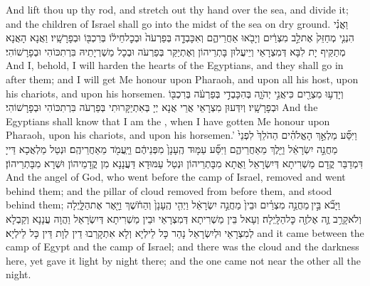 {And lift thou up thy rod, and stretch out thy hand over the sea, and divide it; and the children of Israel shall go into the midst of the sea on dry ground.}{}
{וַאֲנִ֗י הִנְנִ֤י מְחַזֵּק֙ אֶת\maqqaf לֵ֣ב מִצְרַ֔יִם וְיָבֹ֖אוּ אַחֲרֵיהֶ֑ם וְאִכָּבְדָ֤ה בְּפַרְעֹה֙ וּבְכׇל\maqqaf חֵיל֔וֹ בְּרִכְבּ֖וֹ וּבְפָרָשָֽׁיו׃}
{וַאֲנָא הָאֲנָא מְתַקֵּיף יָת לִבָּא דְּמִצְרָאֵי וְיֵיעֲלוּן בָּתְרֵיהוֹן וְאֶתְיַקַּר בְּפַרְעֹה וּבְכָל מַשְׁרְיָתֵיהּ בִּרְתִכּוֹהִי וּבְפָרָשׁוֹהִי׃}
{And I, behold, I will harden the hearts of the Egyptians, and they shall go in after them; and I will get Me honour upon Pharaoh, and upon all his host, upon his chariots, and upon his horsemen.}{}
{וְיָדְע֥וּ מִצְרַ֖יִם כִּי\maqqaf אֲנִ֣י יְהֹוָ֑ה בְּהִכָּבְדִ֣י בְּפַרְעֹ֔ה בְּרִכְבּ֖וֹ וּבְפָרָשָֽׁיו׃}
{וְיִדְּעוּן מִצְרָאֵי אֲרֵי אֲנָא יְיָ בְּאִתְיַקָּרוּתִי בְּפַרְעֹה בִּרְתִכּוֹהִי וּבְפָרָשׁוֹהִי׃}
{And the Egyptians shall know that I am the \lord, when I have gotten Me honour upon Pharaoh, upon his chariots, and upon his horsemen.’}{}
{וַיִּסַּ֞ע מַלְאַ֣ךְ הָאֱלֹהִ֗ים הַהֹלֵךְ֙ לִפְנֵי֙ מַחֲנֵ֣ה יִשְׂרָאֵ֔ל וַיֵּ֖לֶךְ מֵאַחֲרֵיהֶ֑ם וַיִּסַּ֞ע עַמּ֤וּד הֶֽעָנָן֙ מִפְּנֵיהֶ֔ם וַיַּֽעֲמֹ֖ד מֵאַחֲרֵיהֶֽם׃}
{וּנְטַל מַלְאֲכָא דַּייָ דִּמְדַבַּר קֳדָם מַשְׁרִיתָא דְּיִשְׂרָאֵל וַאֲתָא מִבָּתְרֵיהוֹן וּנְטַל עַמּוּדָא דַּעֲנָנָא מִן קֳדָמֵיהוֹן וּשְׁרָא מִבָּתְרֵיהוֹן׃}
{And the angel of God, who went before the camp of Israel, removed and went behind them; and the pillar of cloud removed from before them, and stood behind them;}{}
{וַיָּבֹ֞א בֵּ֣ין \legarmeh  מַחֲנֵ֣ה מִצְרַ֗יִם וּבֵין֙ מַחֲנֵ֣ה יִשְׂרָאֵ֔ל וַיְהִ֤י הֶֽעָנָן֙ וְהַחֹ֔שֶׁךְ וַיָּ֖אֶר אֶת\maqqaf הַלָּ֑יְלָה וְלֹא\maqqaf קָרַ֥ב זֶ֛ה אֶל\maqqaf זֶ֖ה כׇּל\maqqaf הַלָּֽיְלָה׃}
{וְעָאל בֵּין מַשְׁרִיתָא דְּמִצְרָאֵי וּבֵין מַשְׁרִיתָא דְּיִשְׂרָאֵל וַהֲוָה עֲנָנָא וְקַבְלָא לְמִצְרָאֵי וּלְיִשְׂרָאֵל נָהַר כָּל לֵילְיָא וְלָא אִתְקָרַבוּ דֵין לְוָת דֵּין כָּל לֵילְיָא׃}
{and it came between the camp of Egypt and the camp of Israel; and there was the cloud and the darkness here, yet gave it light by night there; and the one came not near the other all the night.}{}
